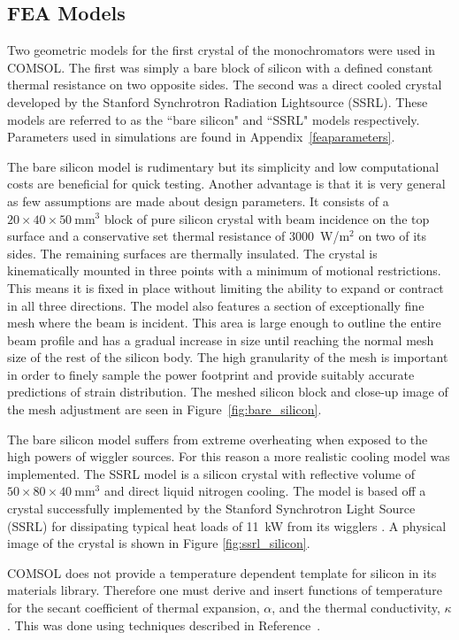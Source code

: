 \documentclass{iucr}
\begin{document}
\subsection{FEA Models}

Two geometric models for the first crystal of the monochromators were used in COMSOL. The first was simply a bare block of silicon with a defined constant thermal resistance on two opposite sides. The second was a direct cooled crystal developed by the Stanford Synchrotron Radiation Lightsource (SSRL). These models are referred to as the ``bare silicon" and ``SSRL" models respectively. Parameters used in simulations are found in Appendix~\ref{feaparameters}.

The bare silicon model is rudimentary but its simplicity and low computational costs are beneficial for quick testing. Another advantage is that it is very general as few assumptions are made about design parameters. It consists of a $20\times 40\times 50~$mm$^3$ block of pure silicon crystal with beam incidence on the top surface and a conservative set thermal resistance of 3000~W/m$^2$ on two of its sides. The remaining surfaces are thermally insulated. The crystal is kinematically mounted in three points with a minimum of motional restrictions. This means it is fixed in place without limiting the ability to expand or contract in all three directions. The model also features a section of exceptionally fine mesh where the beam is incident. This area is large enough to outline the entire beam profile and has a gradual increase in size until reaching the normal mesh size of the rest of the silicon body. The high granularity of the mesh is important in order to finely sample the power footprint and provide suitably accurate predictions of strain distribution. The meshed silicon block and close-up image of the mesh adjustment are seen in Figure~\ref{fig:bare_silicon}.

The bare silicon model suffers from extreme overheating when exposed to the high powers of wiggler sources. For this reason a more realistic cooling model was implemented. The SSRL model is a silicon crystal with reflective volume of $50\times 80\times 40~$mm$^3$ and direct liquid nitrogen cooling. The model is based off a crystal successfully implemented by the Stanford Synchrotron Light Source (SSRL) for dissipating typical heat loads of 11~kW from its wigglers \cite{stanford}. A physical image of the crystal is shown in Figure \ref{fig:ssrl_silicon}.

COMSOL does not provide a temperature dependent template for silicon in its materials library. Therefore one must derive and insert functions of temperature for the secant coefficient of thermal expansion, $\alpha$, and the thermal conductivity, $\kappa$. This was done using techniques described in Reference~\cite{mash}.
\end{document}

